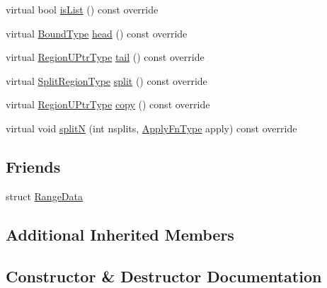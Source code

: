 \begin{DoxyCompactItemize}
\item 
virtual bool \hyperlink{structvt_1_1group_1_1region_1_1_range_aaa2df0017d61507802bcc90a88fcda91}{is\+List} () const override
\item 
virtual \hyperlink{structvt_1_1group_1_1region_1_1_region_abf426ff85bed72c1c6524fad6a9f1751}{Bound\+Type} \hyperlink{structvt_1_1group_1_1region_1_1_range_ab6abce20eb32475d0ae734770b6586c0}{head} () const override
\item 
virtual \hyperlink{structvt_1_1group_1_1region_1_1_region_ae5f42cf159116a3cf8bd65423eb01037}{Region\+U\+Ptr\+Type} \hyperlink{structvt_1_1group_1_1region_1_1_range_a409f171c688707fa71e4aea1099ce691}{tail} () const override
\item 
virtual \hyperlink{structvt_1_1group_1_1region_1_1_region_ab8d05c0978c7f38292a9ed5a15498a4b}{Split\+Region\+Type} \hyperlink{structvt_1_1group_1_1region_1_1_range_a0d2542edc1fccecc5ba898484f0ccd3f}{split} () const override
\item 
virtual \hyperlink{structvt_1_1group_1_1region_1_1_region_ae5f42cf159116a3cf8bd65423eb01037}{Region\+U\+Ptr\+Type} \hyperlink{structvt_1_1group_1_1region_1_1_range_a9b7985ec60471524e11bb933fd0f6821}{copy} () const override
\item 
virtual void \hyperlink{structvt_1_1group_1_1region_1_1_range_a6fcfec2c3fabe024559c2f278a8d12e5}{splitN} (int nsplits, \hyperlink{structvt_1_1group_1_1region_1_1_region_a7c9e99b1157d2fe2f3e6fc36a1463a96}{Apply\+Fn\+Type} apply) const override
\end{DoxyCompactItemize}
\subsection*{Friends}
\begin{DoxyCompactItemize}
\item 
struct \hyperlink{structvt_1_1group_1_1region_1_1_range_a2a3990246b3bab9c29636b30aa9741ac}{Range\+Data}
\end{DoxyCompactItemize}
\subsection*{Additional Inherited Members}


\subsection{Constructor \& Destructor Documentation}
\mbox{\label{structvt_1_1group_1_1region_1_1_range_a6691cd13c504bdabbb67129f652b816a}} 
